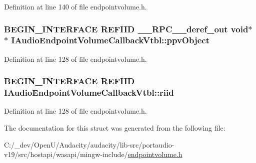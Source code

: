 Definition at line 140 of file endpointvolume.\+h.

\subsubsection[{\texorpdfstring{ppv\+Object}{ppvObject}}]{\setlength{\rightskip}{0pt plus 5cm}B\+E\+G\+I\+N\+\_\+\+I\+N\+T\+E\+R\+F\+A\+CE {\bf R\+E\+F\+I\+ID} {\bf \+\_\+\+\_\+\+R\+P\+C\+\_\+\+\_\+deref\+\_\+out} {\bf void}$\ast$$\ast$ I\+Audio\+Endpoint\+Volume\+Callback\+Vtbl\+::ppv\+Object}\hypertarget{struct_i_audio_endpoint_volume_callback_vtbl_a1a70677faf66fbdc03ba70bda97651fd}{}\label{struct_i_audio_endpoint_volume_callback_vtbl_a1a70677faf66fbdc03ba70bda97651fd}


Definition at line 128 of file endpointvolume.\+h.

\subsubsection[{\texorpdfstring{riid}{riid}}]{\setlength{\rightskip}{0pt plus 5cm}B\+E\+G\+I\+N\+\_\+\+I\+N\+T\+E\+R\+F\+A\+CE {\bf R\+E\+F\+I\+ID} I\+Audio\+Endpoint\+Volume\+Callback\+Vtbl\+::riid}\hypertarget{struct_i_audio_endpoint_volume_callback_vtbl_a3f9b26092a79871d7ccc29aa73f0a663}{}\label{struct_i_audio_endpoint_volume_callback_vtbl_a3f9b26092a79871d7ccc29aa73f0a663}


Definition at line 128 of file endpointvolume.\+h.



The documentation for this struct was generated from the following file\+:\begin{DoxyCompactItemize}
\item 
C\+:/\+\_\+dev/\+Open\+U/\+Audacity/audacity/lib-\/src/portaudio-\/v19/src/hostapi/wasapi/mingw-\/include/\hyperlink{endpointvolume_8h}{endpointvolume.\+h}\end{DoxyCompactItemize}
